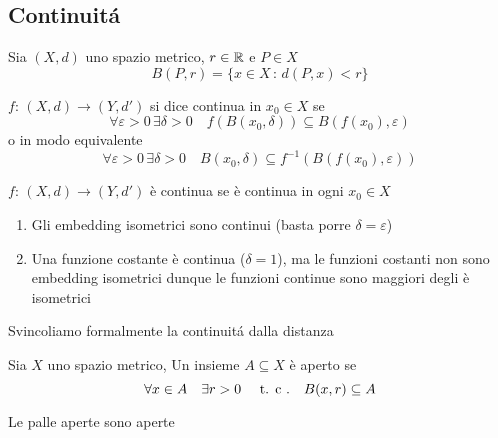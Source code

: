 \subsection{Continuit\'a}

\begin{defn}[Palla]Sia $(X,d)$ uno spazio metrico, $r\in \mathbb{R}$ e $P\in X$
$$ B(P,r) =\{ x \in X \, : \, d(P,x)<r \}$$	
\end{defn}

\begin{defn}\bianco
$ f:\, (X,d) \to (Y,d')$ si dice continua in $x_0 \in X$ se 
$$ \forall \varepsilon >0 \, \exists \delta >0 \quad f(B(x_0,\delta))\subseteq B(f(x_0), \varepsilon)$$
o in modo equivalente
	$$ \forall \varepsilon >0 \, \exists \delta >0 \quad B(x_0,\delta)\subseteq f^{-1}(B(f(x_0), \varepsilon))$$
\end{defn}
\begin{defn}\bianco
$f:\, (X,d) \to (Y,d')$ \`e continua se \`e continua in ogni $x_0\in X$
\end{defn}
\begin{oss}\bbianco
\begin{enumerate}
	\item Gli embedding isometrici sono continui (basta porre $\delta=\varepsilon$)
	\item Una funzione costante \`e continua ($\delta=1$), ma le funzioni costanti non sono embedding isometrici dunque le funzioni continue sono maggiori degli \`e isometrici
\end{enumerate}	
\end{oss}
Svincoliamo formalmente la continuit\'a dalla distanza
\begin{defn}[Aperto]\label{aperti_d}\bianco
Sia $X$ uno spazio metrico, Un insieme  $A\subseteq X $ \`e aperto se 
$$ \forall x\in A \quad \exists r>0 \quad \text{ t. c .} \quad B(x,r)\subseteq A $$
 \end{defn}
 \begin{ex}
 Le palle aperte sono aperte	
 \end{ex}
 
